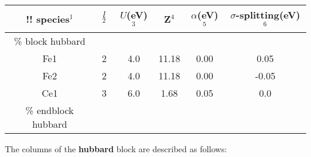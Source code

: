 \documentclass[a4paper,oneside,11pt]{article}
\numberwithin{equation}{section}
\begin{document}
\begin{table}[!h]
{\centering \begin{tabular}{|c|c|c|c|c|c|}
\hline\hline
!! species$^1$      &  $l$ $^2$ & $U$(eV)$^3$ & Z$^4$ & $\alpha$(eV)$^5$  & $\sigma$-splitting(eV)$^6$   \\
\hline
\% block hubbard & & & & & \\
Fe1 & 2 & 4.0 & 11.18 & 0.00 & 0.05    \\
Fe2 & 2 & 4.0 & 11.18 &  0.00 & -0.05    \\
Ce1 & 3 & 6.0  & 1.68 & 0.05 & 0.0     \\
\% endblock hubbard & & & & & \\
\hline\hline
\end{tabular}\par}
\end{table}

The columns of the \textbf{hubbard} block are described as follows:
\end{document}
